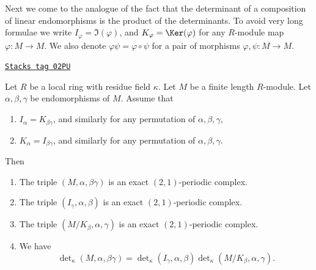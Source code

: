 Next we come to the analogue of the fact that the determinant
of a composition of linear endomorphisms is the product of
the determinants. To avoid very long formulae we
write $I_\varphi = \Im(\varphi)$, and
$K_\varphi = \Ker(\varphi)$
for any $R$-module map $\varphi : M \to M$.
We also denote $\varphi\psi = \varphi \circ \psi$
for a pair of morphisms $\varphi, \psi : M \to M$.

\begin{lemma}
\label{chow-lemma-multiplicativity-determinant}
\href{https://stacks.math.columbia.edu/tag/02PU}{\texttt{Stacks tag 02PU}}

Let $R$ be a local ring with residue field $\kappa$.
Let $M$ be a finite length $R$-module.
Let $\alpha, \beta, \gamma$ be endomorphisms of $M$.
Assume that
\begin{enumerate}
\item $I_\alpha = K_{\beta\gamma}$, and similarly for any permutation
of $\alpha, \beta, \gamma$,
\item $K_\alpha = I_{\beta\gamma}$, and similarly for any permutation
of $\alpha, \beta, \gamma$.
\end{enumerate}
Then
\begin{enumerate}
\item The triple $(M, \alpha, \beta\gamma)$
is an exact $(2, 1)$-periodic complex.
\item The triple $(I_\gamma, \alpha, \beta)$
is an exact $(2, 1)$-periodic complex.
\item The triple $(M/K_\beta, \alpha, \gamma)$
is an exact $(2, 1)$-periodic complex.
\item We have
$$
\det\nolimits_\kappa(M, \alpha, \beta\gamma)
=
\det\nolimits_\kappa(I_\gamma, \alpha, \beta)
\det\nolimits_\kappa(M/K_\beta, \alpha, \gamma).
$$
\end{enumerate}
\end{lemma}

